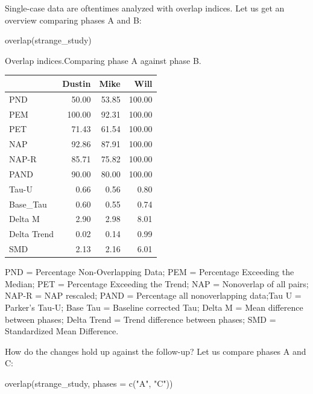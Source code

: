 \documentclass[
]{book}
\newenvironment{Shaded}{\begin{snugshade}}{\end{snugshade}}
\newcommand{\AttributeTok}[1]{\textcolor[rgb]{0.77,0.63,0.00}{#1}}
\newcommand{\FunctionTok}[1]{\textcolor[rgb]{0.00,0.00,0.00}{#1}}
\newcommand{\NormalTok}[1]{#1}
\newcommand{\StringTok}[1]{\textcolor[rgb]{0.31,0.60,0.02}{#1}}
\begin{document}
Single-case data are oftentimes analyzed with overlap indices. Let us get an overview comparing phases A and B:

\begin{Shaded}
\begin{Highlighting}[]
\FunctionTok{overlap}\NormalTok{(strange\_study)}
\end{Highlighting}
\end{Shaded}

Overlap indices.Comparing phase A against phase B.

\begin{table}
\centering
\begin{tabular}{lrrr}
\toprule
  & Dustin & Mike & Will\\
\midrule
PND & 50.00 & 53.85 & 100.00\\
PEM & 100.00 & 92.31 & 100.00\\
PET & 71.43 & 61.54 & 100.00\\
NAP & 92.86 & 87.91 & 100.00\\
NAP-R & 85.71 & 75.82 & 100.00\\
\addlinespace
PAND & 90.00 & 80.00 & 100.00\\
Tau-U & 0.66 & 0.56 & 0.80\\
Base\_Tau & 0.60 & 0.55 & 0.74\\
Delta M & 2.90 & 2.98 & 8.01\\
Delta Trend & 0.02 & 0.14 & 0.99\\
\addlinespace
SMD & 2.13 & 2.16 & 6.01\\
\bottomrule
\end{tabular}
\end{table}

PND = Percentage Non-Overlapping Data; PEM = Percentage Exceeding the Median; PET = Percentage Exceeding the Trend; NAP = Nonoverlap of all pairs; NAP-R = NAP rescaled;
PAND = Percentage all nonoverlapping data;Tau U = Parker's Tau-U; Base Tau = Baseline corrected Tau; Delta M = Mean difference between phases; Delta Trend = Trend difference between phases; SMD = Standardized Mean Difference.

How do the changes hold up against the follow-up? Let us compare phases A and C:

\begin{Shaded}
\begin{Highlighting}[]
\FunctionTok{overlap}\NormalTok{(strange\_study, }\AttributeTok{phases =} \FunctionTok{c}\NormalTok{(}\StringTok{"A"}\NormalTok{, }\StringTok{"C"}\NormalTok{))}
\end{Highlighting}
\end{Shaded}
\end{document}
